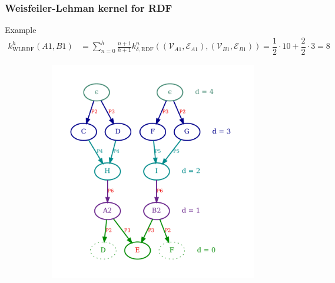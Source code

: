 \documentclass{beamer}
\begin{document}

\begingroup
\footnotesize
\begin{frame}
\frametitle{Weisfeiler-Lehman kernel for RDF}

\begin{exampleblock}{Example}
\begin{align*}
k_{\mathrm{WLRDF}}^h\left(A1, B1\right) &= \sum_{n=0}^h \frac{n+1}{h+1} k_{\delta, \mathrm{RDF}}^{n}\left(\left(\mathcal{V}_{A1}, \mathcal{E}_{A1}\right),\left(\mathcal{V}_{B1}, \mathcal{E}_{B1}\right)\right) = \dfrac{1}{2} \cdot 10 + \dfrac{2}{2} \cdot 3 = 8
\end{align*}
\end{exampleblock}

\begin{figure}
\centering
\begin{subfigure}{.5\textwidth}
    \centering
    \includegraphics[width=0.9\linewidth]{img/07-subGraph_A1_B1_vertical}
\end{subfigure}%
\begin{subfigure}{.5\textwidth}
    \centering

\end{subfigure}
\end{figure}
\end{frame}
\end{document}
